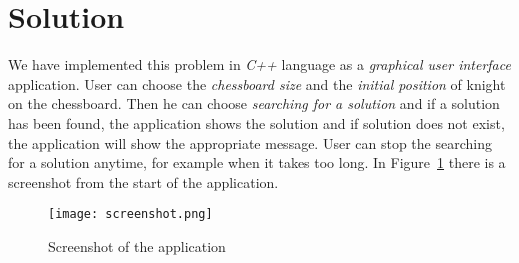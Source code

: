 \newpage

\section{Solution}

We have implemented this problem in \emph{C++} language as a \emph{graphical user interface} application. User can choose the \emph{chessboard size} and the \emph{initial position} of knight on the chessboard. Then he can choose \emph{searching for a solution} and if a solution has been found, the application shows the solution and if solution does not exist, the application will show the appropriate message. User can stop the searching for a solution anytime, for example when it takes too long. In Figure~\ref{fig:screenshot} there is a screenshot from the start of the application.

\begin{figure}[H]
\centering
\texttt{[image: screenshot.png]}
\caption[Screenshot of the application]{Screenshot of the application}
\label{fig:screenshot}
\end{figure}